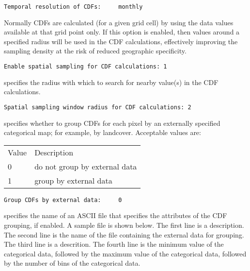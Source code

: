  \begin{Verbatim}[frame=single]
Temporal resolution of CDFs:     monthly
 \end{Verbatim}

 
 Normally CDFs are calculated (for a given grid cell) by using 
 the data values available at that grid point only. If this option
 is enabled, then values around a specified radius will be used
 in the CDF calculations, effectively improving the sampling
 density at the risk of reduced geographic specificity. 
 

 \begin{Verbatim}[frame=single]
Enable spatial sampling for CDF calculations: 1
 \end{Verbatim}

 
 specifies the radius with which
 to search for nearby value(s) in the CDF calculations. 
 

 \begin{Verbatim}[frame=single]
Spatial sampling window radius for CDF calculations: 2
 \end{Verbatim}

 
  specifies whether to group CDFs
 for each pixel by an externally specified categorical map; for example,
 by landcover.
 Acceptable values are:

 \begin{tabular}{ll}
 Value & Description                   \\
 0     & do not group by external data \\
 1     & group by external data        \\
 \end{tabular}
 

 \begin{Verbatim}[frame=single]
Group CDFs by external data:     0
 \end{Verbatim}

 
  specifies the name of an
 ASCII file that specifies the attributes of the CDF grouping,
 if enabled.  A sample file is shown below.
 The first line is a description.  The second line is
 the name of the file containing the external data for grouping.
 The third line is a descrition.  The fourth line is the minimum
 value of the categorical data, followed by the maximum value of the
 categorical data, followed by the number of bins of the categorical
 data.

